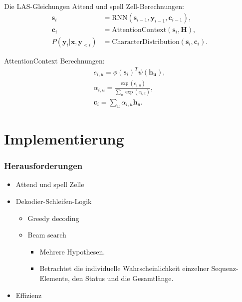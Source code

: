 \documentclass[10pt]{beamer}
\begin{document}
\begin{frame}{Die LAS-Gleichungen}
Attend und spell Zell-Berechnungen:
\begin{align}
	 \mathbf{s}_i &= \text{RNN}(\mathbf{s}_{i-1}, \mathbf{y}_{i-1}, \mathbf{c}_{i-1}), \\
	 \mathbf{c}_i &= \text{AttentionContext}(\mathbf{s}_i,\mathbf{H}), \\
	  P(\mathbf{y}_i|\mathbf{x}, \mathbf{y}_{<i}) &= \text{CharacterDistribution}(\mathbf{s}_i,\textbf{c}_i).
\end{align}

AttentionContext Berechnungen:
\begin{align}
	e_{i,u} = \phi(\mathbf{s}_i)^T \psi(\mathbf{h_u}), \\
	\alpha_{i,u} = \frac{ \exp(e_{i,u})}{ \sum\limits_{u} \exp(e_{i,u})}, \\
	\label{eq:alphas}
	\mathbf{c}_i = \sum\limits_{u} \alpha_{i,u} \mathbf{h}_u.
\end{align}
\end{frame}

\section{Implementierung}


\begin{frame}[fragile]
\frametitle{Herausforderungen}
\begin{itemize}

\item Attend und spell Zelle
\item Dekodier-Schleifen-Logik
	\begin{itemize}
	\item Greedy decoding
	\item Beam search
		\begin{itemize}
		\item Mehrere Hypothesen.
		\item Betrachtet die individuelle Wahrscheinlichkeit einzelner
			  Sequenz-Elemente, den Status und die Gesamtlänge.
		\end{itemize}
	\end{itemize}
\item Effizienz
\end{itemize}
\end{frame}
\end{document}
